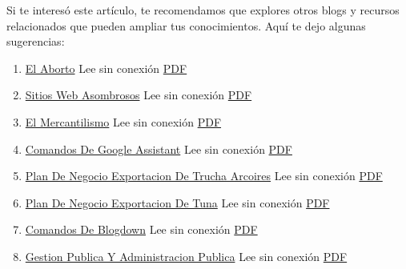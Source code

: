 \documentclass[
  jou,
  floatsintext,
  longtable,
  a4paper,
  nolmodern,
  notxfonts,
  notimes,
  colorlinks=true,linkcolor=blue,citecolor=blue,urlcolor=blue]{apa7}
\providecommand{\tightlist}{%
  \setlength{\itemsep}{0pt}\setlength{\parskip}{0pt}}
\begin{document}
Si te interesó este artículo, te recomendamos que explores otros blogs y
recursos relacionados que pueden ampliar tus conocimientos. Aquí te dejo
algunas sugerencias:

\begin{enumerate}
\def\labelenumi{\arabic{enumi}.}
\tightlist
\item
  \href{https://achalmaedison.netlify.app/blog/posts/2015-05-14-el-aborto}{El
  Aborto} Lee sin conexión
  \href{https://achalmaedison.netlify.app/blog/posts/2015-05-14-el-aborto/index.pdf}{PDF}
\item
  \href{https://achalmaedison.netlify.app/blog/posts/2017-04-23-sitios-web-asombrosos}{Sitios
  Web Asombrosos} Lee sin conexión
  \href{https://achalmaedison.netlify.app/blog/posts/2017-04-23-sitios-web-asombrosos/index.pdf}{PDF}
\item
  \href{https://achalmaedison.netlify.app/blog/posts/2017-05-23-el-mercantilismo}{El
  Mercantilismo} Lee sin conexión
  \href{https://achalmaedison.netlify.app/blog/posts/2017-05-23-el-mercantilismo/index.pdf}{PDF}
\item
  \href{https://achalmaedison.netlify.app/blog/posts/2020-05-23-comandos-de-google-assistant}{Comandos
  De Google Assistant} Lee sin conexión
  \href{https://achalmaedison.netlify.app/blog/posts/2020-05-23-comandos-de-google-assistant/index.pdf}{PDF}
\item
  \href{https://achalmaedison.netlify.app/blog/posts/2020-09-15-plan-de-negocio-exportacion-de-trucha-arcoires}{Plan
  De Negocio Exportacion De Trucha Arcoires} Lee sin conexión
  \href{https://achalmaedison.netlify.app/blog/posts/2020-09-15-plan-de-negocio-exportacion-de-trucha-arcoires/index.pdf}{PDF}
\item
  \href{https://achalmaedison.netlify.app/blog/posts/2021-07-13-plan-de-negocio-exportacion-de-tuna}{Plan
  De Negocio Exportacion De Tuna} Lee sin conexión
  \href{https://achalmaedison.netlify.app/blog/posts/2021-07-13-plan-de-negocio-exportacion-de-tuna/index.pdf}{PDF}
\item
  \href{https://achalmaedison.netlify.app/blog/posts/2021-07-14-comandos-de-blogdown}{Comandos
  De Blogdown} Lee sin conexión
  \href{https://achalmaedison.netlify.app/blog/posts/2021-07-14-comandos-de-blogdown/index.pdf}{PDF}
\item
  \href{https://achalmaedison.netlify.app/blog/posts/2021-10-01-gestion-publica-y-administracion-publica}{Gestion
  Publica Y Administracion Publica} Lee sin conexión
  \href{https://achalmaedison.netlify.app/blog/posts/2021-10-01-gestion-publica-y-administracion-publica/index.pdf}{PDF}

\end{enumerate}
\end{document}
